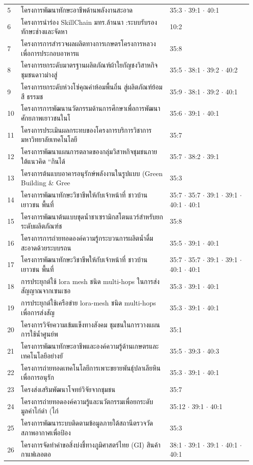 {\begin{longtable}{@{}p{0.42cm}p{8.3cm}p{4.75cm}@{}}
5 & โครงการพัฒนาทักษะอาชีพด้านพลังงานสะอาด & 35:3 $\cdot$ 39:1 $\cdot$ 40:1\\
6 & โครงการนำร่อง SkillChain มทร.ล้านนา :ระบบรับรองทักษะช่างและจัดหา & 10:2\\
7 & โครงการการสำรวจผลผลิตทางการเกษตรโครงการหลวง เพื่อการประกอบอาหารแ & 35:8\\
8 & โครงการยกระดับมาตรฐานผลิตภัณฑ์ผ้าใยกัญชงวิสาหกิจชุมชนดาวม่างสู่ & 35:5 $\cdot$ 38:1 $\cdot$ 39:2 $\cdot$ 40:2\\
9 & โครงการยกระดับห่วงโซ่คุณค่าห้อมพื้นถิ่น สู่ผลิตภัณฑ์ย้อมสี ธรรมช & 35:9 $\cdot$ 38:1 $\cdot$ 39:2 $\cdot$ 40:1\\
10 & โครงการการพัฒนานวัตกรรมด้านการศึกษาเพื่อการพัฒนาศักยภาพเยาวชนในโ & 35:6 $\cdot$ 39:1 $\cdot$ 40:1\\
11 & โครงการประเมินผลกระทบของโครงการบริการวิชาการมหาวิทยาลัยเทคโนโลยี & 35:7\\
12 & โครงการพัฒนาแผนการตลาดของกลุ่มวิสาหกิจชุมชนภายใต้แนวคิด “กินได้ & 35:7 $\cdot$ 38:2 $\cdot$ 39:1\\
13 & โครงการต้นแบบอาคารอนุรักษ์พลังงานในรูปแบบ (Green Building \& Gree & 35:3\\
14 & โครงการพัฒนาทักษะวิชาชีพให้กับเจ้าหน้าที่ ชาวบ้าน เยาวชน พื้นที่ & 35:7 $\cdot$ 35:7 $\cdot$ 39:1 $\cdot$ 39:1 $\cdot$ 40:1 $\cdot$ 40:1\\
15 & โครงการพัฒนาต้นแบบชุดน้ำชาเซรามิกสโตนแวร์สำหรับยกระดับผลิตภัณฑ์ช & 35:8\\
16 & โครงการการถ่ายทอดองค์ความรู้กระบวนการผลิตน้ำดื่มสะอาดด้วยระบบรถน & 35:5 $\cdot$ 39:1 $\cdot$ 40:1\\
17 & โครงการพัฒนาทักษะวิชาชีพให้กับเจ้าหน้าที่ ชาวบ้าน เยาวชน พื้นที่ & 35:7 $\cdot$ 35:7 $\cdot$ 39:1 $\cdot$ 39:1 $\cdot$ 40:1 $\cdot$ 40:1\\
18 & การประยุกต์ใช้ lora mesh ชนิด multi-hops ในการส่งสัญญาณจากเซนเซอ & 35:3 $\cdot$ 39:1 $\cdot$ 40:1\\
19 & การประยุกต์ใช้เครือข่าย lora-mesh ชนิด multi-hops เพื่อการส่งสัญ & 35:3 $\cdot$ 39:1 $\cdot$ 40:1\\
20 & โครงการวิจัยความเข้มแข็งทางสังคม ชุมชนในการวางแผนการใช้น้ำศูนย์พ & 35:1\\
21 & โครงการพัฒนาทักษะอาชีพและองค์ความรู้ด้านเกษตรและเทคโนโลยีอย่างยั & 35:5 $\cdot$ 39:3 $\cdot$ 40:3\\
22 & โครงการถ่ายทอดเทคโนโลยีการเพาะขยายพันธุ์ปลาเลียหินเพื่อการอนุรัก & 35:3 $\cdot$ 39:1 $\cdot$ 40:1\\
23 & โครงส่งเสริมพัฒนาโจทย์วิจัยจากชุมชน & 35:7\\
24 & โครงการถ่ายทอดองค์ความรู้และนวัตกรรมเพื่อยกระดับมูลค่าไก่ดำ (ไก่ & 35:12 $\cdot$ 39:1 $\cdot$ 40:1\\
25 & โครงการพัฒนาระบบติดตามข้อมูลภายใต้สถานีตรวจวัดสภาพอากาศเพื่อป้อง & 35:3\\
26 & โครงการจัดทำคำขอสิ่งบ่งชี้ทางภูมิศาสตร์ไทย (GI) สินค้ากาแฟเลอตอ & 38:1 $\cdot$ 39:1 $\cdot$ 39:1 $\cdot$ 40:1 $\cdot$ 40:1\\
\midrule
\bottomrule
\end{longtable}
}
